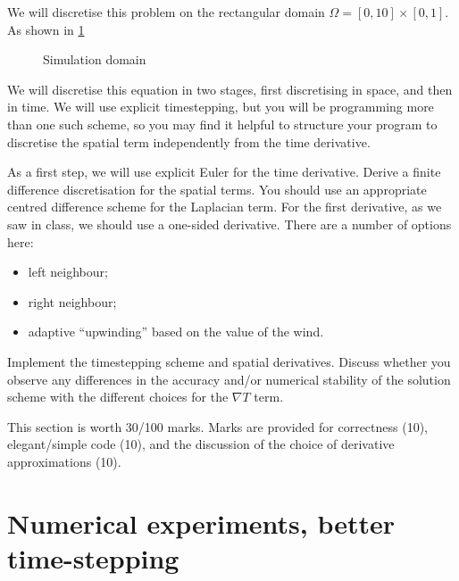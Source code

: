 \documentclass[11pt,a4paper]{article}
\begin{document}
We will discretise this problem on the rectangular domain $\Omega =
[0, 10] \times [0, 1]$. As shown in \cref{fig:omega}
\begin{figure}[htbp]
  \centering
  \caption{Simulation domain}
  \label{fig:omega}
\end{figure}


We will discretise this equation in two stages, first discretising in
space, and then in time. We will use explicit timestepping, but you
will be programming more than one such scheme, so you may find it
helpful to structure your program to discretise the spatial term
independently from the time derivative.

As a first step, we will use explicit Euler for the time derivative.
Derive a finite difference discretisation for the spatial terms. You
should use an appropriate centred difference scheme for the Laplacian
term. For the first derivative, as we saw in class, we should use a
one-sided derivative. There are a number of options here:
\begin{itemize}
\item left neighbour;
\item right neighbour;
\item adaptive ``upwinding'' based on the value of the wind.
\end{itemize}
Implement the timestepping scheme and spatial derivatives. Discuss
whether you observe any differences in the accuracy and/or numerical
stability of the solution scheme with the different choices for the
$\nabla T$ term.

This section is worth 30/100 marks. Marks are provided for
correctness (10), elegant/simple code (10), and the discussion of the
choice of derivative approximations (10).

\section{Numerical experiments, better time-stepping}
\label{sec:part2}
\end{document}

